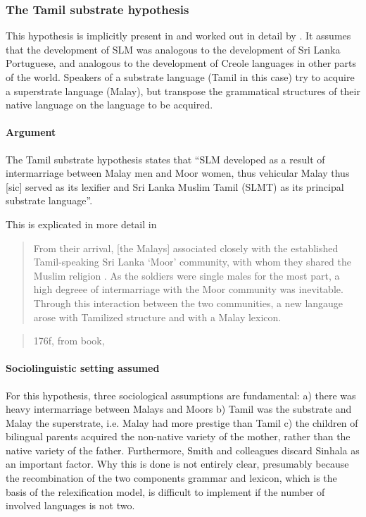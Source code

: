\subsubsection{The Tamil substrate hypothesis}
This hypothesis is implicitly present in \citet{Hussainmiya1990} and worked out in detail by \citet{SmithEtAl2004, SmithEtAl2007, Paauw2004}. It assumes that the development of SLM was analogous to the development of Sri Lanka Portuguese, and analogous to the development of Creole languages in other parts of the world. Speakers of a substrate language (Tamil in this case) try to acquire a superstrate language (Malay), but transpose the grammatical structures of their native language on the language to be acquired. 
 

\paragraph{Argument}
The Tamil substrate hypothesis states that ``SLM developed as a result of intermarriage between Malay men and Moor women, thus vehicular Malay thus [sic] served as its lexifier and Sri Lanka Muslim Tamil (SLMT) as its principal  substrate language''\citet[2]{SmithEtAl2004}.

This is explicated in more detail in \citet[160]{SmithEtAl2007}

\begin{quote}
From their arrival, [the Malays] associated closely with the established Tamil-speaking Sri Lanka `Moor' community, with whom they  shared the Muslim religion \el. As the soldiers were single males for the most part, a high degreee of intermarriage with the Moor community was inevitable. Through this interaction between the two communities, a new langauge arose with Tamilized structure and with a Malay lexicon.
\end{quote}


\begin{quote}
176f, from book, \kuckn
\end{quote}


\paragraph{Sociolinguistic setting assumed}
For this hypothesis, three sociological assumptions are fundamental: a) there was heavy intermarriage between Malays and Moors b) Tamil was the substrate and Malay the superstrate, i.e. Malay had more prestige than Tamil c) the children of bilingual parents acquired the non-native variety of the mother, rather than the native variety of the father. Furthermore, Smith and colleagues discard Sinhala as an important factor. Why this is done is not entirely clear, presumably because the recombination of the two components grammar and lexicon, which is the basis of the relexification model, is difficult to implement if the number of involved languages is not two.  

